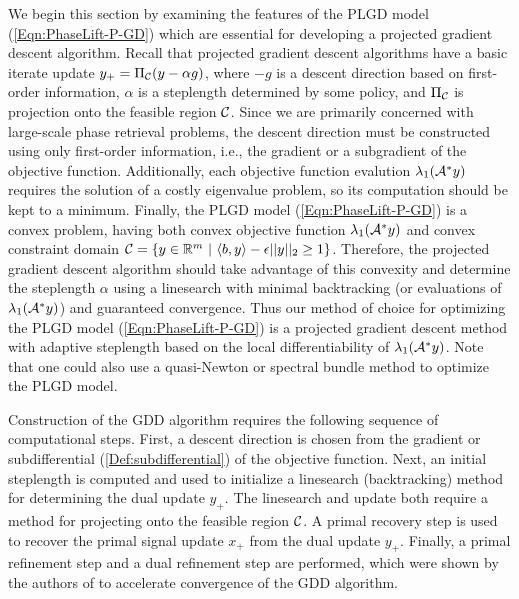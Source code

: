 We begin this section by examining the features of the PLGD model (\ref{Eqn:PhaseLift-P-GD}) which are essential for developing a projected gradient descent algorithm.  
Recall that projected gradient descent algorithms have a basic iterate update $y_+ = \Pi_{\mathcal C}(y - \alpha g)$, where $-g$ is a descent direction based on first-order information, $\alpha$ is a steplength determined by some policy, and $\Pi_{\mathcal C}$ is projection onto the feasible region ${\mathcal C}$.  
Since we are primarily concerned with large-scale phase retrieval problems, the descent direction must be constructed using only first-order information, i.e., the gradient or a subgradient of the objective function.  
Additionally, each objective function evalution $\lambda_1({\mathcal A}^*y)$ requires the solution of a costly eigenvalue problem, so its computation should be kept to a minimum.  
Finally, the PLGD model (\ref{Eqn:PhaseLift-P-GD}) is a convex problem, having both convex objective function $\lambda_1({\mathcal A}^* y)$ and convex constraint domain ${\mathcal C} = \{ y \in \mathbb{R}^m \ | \ \langle b, y \rangle - \epsilon ||y||_2 \geq 1 \}$.   
Therefore, the projected gradient descent algorithm should take advantage of this convexity and determine the steplength $\alpha$ using a linesearch with minimal backtracking (or evaluations of $\lambda_1({\mathcal A}^*y)$) and guaranteed convergence.
Thus our method of choice for optimizing the PLGD model (\ref{Eqn:PhaseLift-P-GD}) is a projected gradient descent method with adaptive steplength based on the local differentiability of $\lambda_1({\mathcal A}^* y)$.
Note that one could also use a quasi-Newton or spectral bundle method to optimize the PLGD model.





Construction of the GDD algorithm requires the following sequence of computational steps.  
First, a descent direction is chosen from the gradient or subdifferential (\ref{Def:subdifferential}) of the objective function.  
Next, an initial steplength is computed and used to initialize a linesearch (backtracking) method for determining the dual update $y_+$.  The linesearch and update both require a method for projecting onto the feasible region ${\mathcal C}$.  
A primal recovery step is used to recover the primal signal update $x_+$ from the dual update $y_+$.
Finally, a primal refinement step and a dual refinement step are performed, which were shown by the authors of \cite{DBLP:journals/siamsc/FriedlanderM16} to accelerate convergence of the GDD algorithm.



